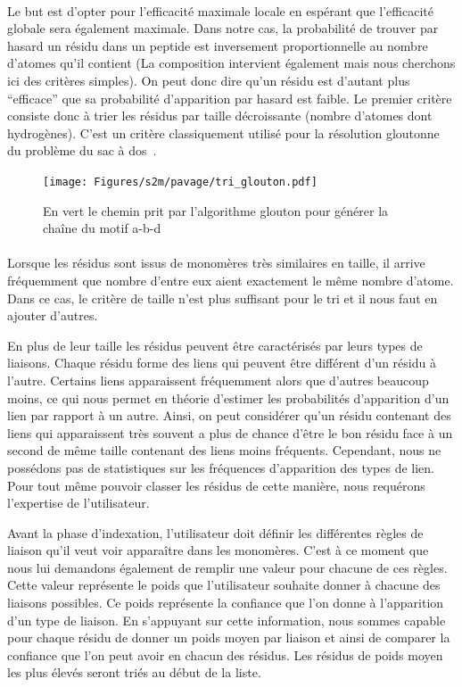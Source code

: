 \documentclass[12pt,french,twoside]{report}
\begin{document}
\paragraph{}Le but est d'opter pour l'efficacité maximale locale en espérant que l'efficacité globale sera également maximale.
Dans notre cas, la probabilité de trouver par hasard un résidu dans un peptide est
inversement proportionnelle au nombre d'atomes qu'il contient (La composition intervient également mais nous cherchons ici des
critères simples). On peut donc dire qu'un résidu est d'autant plus ``efficace'' que sa probabilité d'apparition par hasard est
faible. Le premier critère consiste donc à trier les résidus par taille décroissante (nombre d'atomes dont hydrogènes).
C'est un critère classiquement utilisé pour la résolution gloutonne du problème du sac à dos~\cite{_probleme_2016}.

\begin{figure}
  \texttt{[image: Figures/s2m/pavage/tri\_glouton.pdf]}
  \caption{\label{tri_glouton}En vert le chemin prit par l'algorithme glouton pour générer la chaîne du motif a-b-d}
\end{figure}

\paragraph{}Lorsque les résidus sont issus de monomères très similaires en taille, il arrive fréquemment que nombre d'entre eux
aient exactement le même nombre d'atome.
Dans ce cas, le critère de taille n'est plus suffisant pour le tri et il nous faut en ajouter d'autres.

En plus de leur taille les résidus peuvent être caractérisés par leurs types de liaisons.
Chaque résidu forme des liens qui peuvent être différent d'un résidu à l'autre.
Certains liens apparaissent fréquemment alors que d'autres beaucoup moins, ce qui nous permet en théorie d'estimer les
probabilités d'apparition d'un lien par rapport à un autre.
Ainsi, on peut considérer qu'un résidu contenant des liens qui apparaissent très souvent a plus de chance d'être le bon résidu
face à un second de même taille contenant des liens moins fréquents.
Cependant, nous ne possédons pas de statistiques sur les fréquences d'apparition des types de lien.
Pour tout même pouvoir classer les résidus de cette manière, nous requérons l'expertise de l'utilisateur.

Avant la phase d'indexation, l'utilisateur doit définir les différentes
règles de liaison qu'il veut voir apparaître dans les monomères. C'est à ce moment que nous lui demandons également de remplir
une valeur pour chacune de ces règles. Cette valeur représente le poids que l'utilisateur souhaite donner à chacune des liaisons
possibles. Ce poids représente la confiance que l'on donne à l'apparition d'un type de liaison. En s'appuyant sur cette
information, nous
sommes capable pour chaque résidu de donner un poids moyen par liaison et ainsi de comparer la confiance que l'on peut
avoir en chacun des résidus. Les résidus de poids moyen les plus élevés seront triés au début de la liste.
\end{document}
